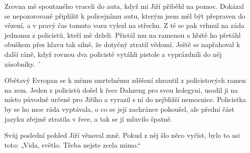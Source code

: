 Zrovna mě spoutaného vraceli do auta, když mi Jiří přiběhl na pomoc. Dokázal se nepozorovaně připlížit k policejnímu autu, kterým jsem měl být přepraven do vězení, a v pravý čas tomuto vozu vylezl na střechu. Z té se pak vrhnul na záda jednomu z policistů, kteří mě drželi. Přistál mu na ramenou a hbitě ho přetáhl obuškem přes hlavu tak silně, že dotyčný ztratil vědomí. Ještě se napřahoval k další ráně, když rovnou dva policisté vytáhli pistole a vyprázdnili do něj zásobníky. ´ 

Obětavý Evropan se k mému smrtelnému zděšení zhroutil z policistových ramen na zem. Jeden z policistů došel k řece Dahzeng pro svou kolegyni, usadil ji na místo původně určené pro Jiřího a vyrazil s ní do nejbližší nemocnice. Policistka by se ho moc ráda vyptávala, o co se její zachránce pokoušel, ale přední část jazyku zřejmě ztratila v řece, a tak se jí mluvilo špatně.

Svůj poslední pohled Jiří věnoval mně. Pokud z něj šlo něco vyčíst, bylo to asi toto: „Vida, světlo. Třeba nejste zcela mimo.“
